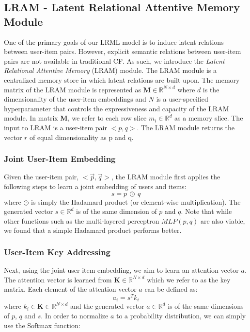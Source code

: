 \documentclass[sigconf]{acmart}
\begin{document}
\subsection{LRAM - Latent Relational Attentive Memory Module}
One of the primary goals of our \textsc{LRML} model is to induce latent relations between user-item pairs. However, explicit semantic relations between user-item pairs are not available in traditional CF. As such, we introduce the \emph{Latent Relational Attentive Memory} (LRAM) module. The LRAM module is a centralized memory store in which latent relations are built upon. The memory matrix of the LRAM module is represented as $\textbf{M} \in \mathbb{R}^{N \times d}$ where $d$ is the dimensionality of the user-item embeddings and $N$ is a user-specified hyperparameter that controls the expressiveness and capacity of the LRAM module. In matrix \textbf{M}, we refer to each row slice $m_{i} \in \mathbb{R}^{d}$ as a memory slice. The input to LRAM is a user-item pair $<p,q>$. The LRAM module returns the vector $r$ of equal dimensionality as p and q. 

\subsubsection{Joint User-Item Embedding}
Given the user-item pair, $<\vec{p},\vec{q}>$, the LRAM module first applies the following steps to learn a joint embedding of users and items:
\begin{equation}
s = p \: \odot \: q
\end{equation}
where $\odot$ is simply the Hadamard product (or element-wise multiplication). The generated vector $s \in \mathbb{R}^{d}$ is of the same dimension of $p$ and $q$. Note that while other functions such as the multi-layered perceptron $MLP(p,q)$ are also viable, we found that a simple Hadamard product performs better. 

\subsubsection{User-Item Key Addressing}
Next, using the joint user-item embedding, we aim to learn an attention vector $a$. The attention vector is learned from $\textbf{K} \in \mathbb{R}^{N \times d}$ which we refer to as the key matrix. Each element of the attention vector $a$ can be defined as:
\begin{equation}
a_i = s^{T} k_i
\end{equation}
where $k_i \in \textbf{K} \in \mathbb{R}^{N \times d}$ and the generated vector $a \in \mathbb{R}^{d}$ is of the same dimensions of $p$, $q$ and $s$. In order to normalize $a$ to a probability distribution, we can simply use the Softmax function:
\end{document}
